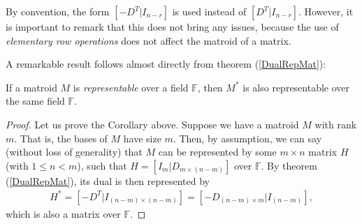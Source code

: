 By convention, the form $[-D^T |I_{n-r}]$ is used instead of $[D^T |I_{n-r}]$. However, it is important to remark that this does not bring any issues, because the use of \textit{elementary row operations} does not affect the matroid of a matrix. 

A remarkable result follows almost directly from theorem (\ref{DualRepMat}):

\begin{corollary} \label{corollaryrepdual}
    If a matroid $M$ is \textit{representable} over a field $\mathbb{F}$, then $M ^* $ is also representable over the same field $\mathbb{F}$.
\end{corollary}

\begin{proof}
    Let us prove the Corollary above. Suppose we have a matroid $M$ with rank $m$. That is, the bases of $M$ have size $m$. Then, by assumption, we can say (without loss of generality) that $M$ can be represented by some $m \times n$ matrix $H$ (with $1\leq n < m$), such that $H=[I_{m}|D_{m \times (n-m)}]$ over $\mathbb{F}$. By theorem (\ref{DualRepMat}), its dual is then represented by 
    \begin{align*}
    H^*=[-D^T|I_{(n-m) \times (n-m)}]=[-D_{(n-m) \times m}|I_{(n-m)}],
    \end{align*}
    which is also a matrix over $\mathbb{F}$.
\end{proof}

